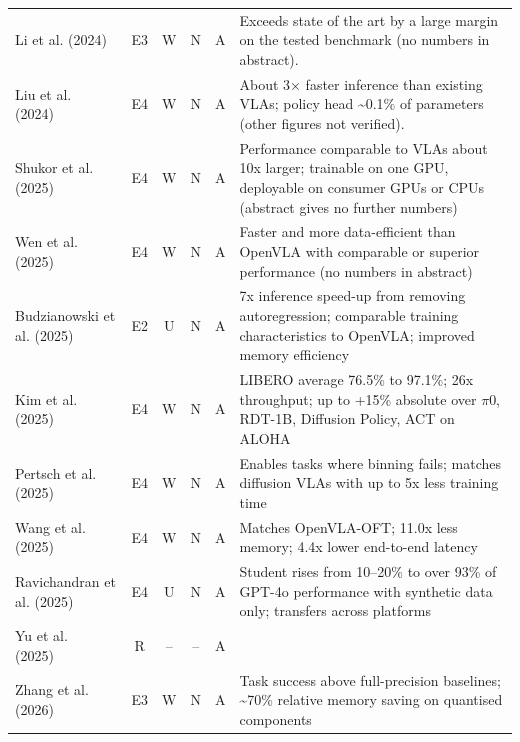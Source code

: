 \documentclass[10pt,a4paper]{article}
\begin{document}
\begin{longtable}{@{}>{\raggedright\arraybackslash}p{4.0cm}cccc>{\raggedright\arraybackslash}p{7.6cm}@{}}
Li et al. (2024)~\cite{Li2024a} & E3 & W & N & A & Exceeds state of the art by a large margin on the tested benchmark (no numbers in abstract). \\
Liu et al. (2024)~\cite{Liu2024a} & E4 & W & N & A & About 3$\times$ faster inference than existing VLAs; policy head \textasciitilde{}0.1\% of parameters (other figures not verified). \\
Shukor et al. (2025)~\cite{Shukor2025} & E4 & W & N & A & Performance comparable to VLAs about 10x larger; trainable on one GPU, deployable on consumer GPUs or CPUs (abstract gives no further numbers) \\
Wen et al. (2025)~\cite{Wen2025} & E4 & W & N & A & Faster and more data-efficient than OpenVLA with comparable or superior performance (no numbers in abstract) \\
Budzianowski et al. (2025)~\cite{Budzianowski2025} & E2 & U & N & A & 7x inference speed-up from removing autoregression; comparable training characteristics to OpenVLA; improved memory efficiency \\
Kim et al. (2025)~\cite{Kim2025} & E4 & W & N & A & LIBERO average 76.5\% to 97.1\%; 26x throughput; up to +15\% absolute over $\pi$0, RDT-1B, Diffusion Policy, ACT on ALOHA \\
Pertsch et al. (2025)~\cite{Pertsch2025} & E4 & W & N & A & Enables tasks where binning fails; matches diffusion VLAs with up to 5x less training time \\
Wang et al. (2025)~\cite{Wang2025a} & E4 & W & N & A & Matches OpenVLA-OFT; 11.0x less memory; 4.4x lower end-to-end latency \\
Ravichandran et al. (2025)~\cite{Ravichandran2025} & E4 & U & N & A & Student rises from 10--20\% to over 93\% of GPT-4o performance with synthetic data only; transfers across platforms \\
Yu et al. (2025)~\cite{Yu2025} & R & -- & -- & A &  \\
Zhang et al. (2026)~\cite{Zhang2026a} & E3 & W & N & A & Task success above full-precision baselines; \textasciitilde{}70\% relative memory saving on quantised components \\
\bottomrule\end{longtable}
\end{document}
